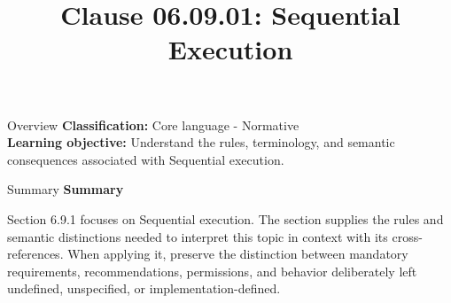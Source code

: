\documentclass[10pt,letterpaper]{article}
\title{Clause 06.09.01: Sequential Execution}
\author{}
\date{}
\begin{document}
\maketitle
\begin{CornellOverviewBox}{Overview}
\textbf{Classification:} Core language - Normative\\[2pt]
\textbf{Learning objective:} Understand the rules, terminology, and semantic consequences associated with Sequential execution.
\end{CornellOverviewBox}\begin{CornellSummaryBox}{Summary}
{\sffamily\bfseries\color{Accent} Summary}\par\vspace{3pt}Section 6.9.1 focuses on Sequential execution. The section supplies the rules and semantic distinctions needed to interpret this topic in context with its cross-references. When applying it, preserve the distinction between mandatory requirements, recommendations, permissions, and behavior deliberately left undefined, unspecified, or implementation-defined.
\end{CornellSummaryBox}
\end{document}
